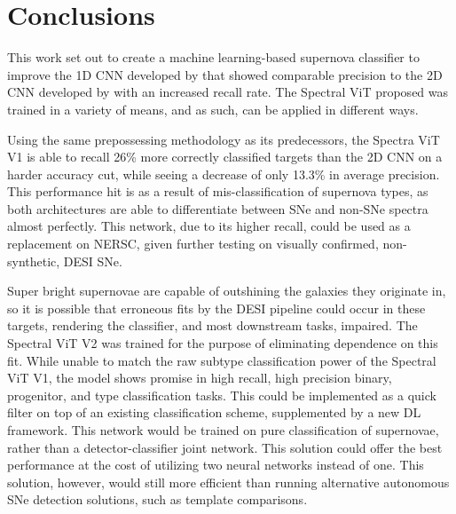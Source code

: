 \chapter{Conclusions}
\label{chap:conclusions}





This work set out to create a machine learning-based supernova classifier to improve 
the 1D CNN developed by \textcite{wasserman2021} that showed comparable 
precision to the 2D CNN developed by \textcite{Sepeku2022} with an increased recall rate. 
The Spectral ViT proposed was trained in a variety of means, and as such, can be applied in different ways.  


Using the same prepossessing methodology as its predecessors, the Spectra ViT V1 is able to recall 
26\% more correctly classified targets than the 2D CNN on a harder accuracy cut, while seeing a decrease 
of only 13.3\% in average precision. This performance hit is as a result of mis-classification of supernova types, 
as both architectures are able to differentiate between SNe and non-SNe spectra almost perfectly. This 
network, due to its higher recall, could be used as a replacement on NERSC, given further testing 
on visually confirmed, non-synthetic, DESI SNe. 

Super bright supernovae are capable of outshining the galaxies they originate in, so it is possible that 
erroneous fits by the DESI pipeline could occur in these targets, rendering the classifier, and most downstream tasks, 
impaired. The Spectral ViT V2 was trained for the purpose of eliminating dependence on this fit.
While unable to match the raw subtype classification power of the Spectral ViT V1, the 
model shows promise in high recall, high precision binary, progenitor, and type classification tasks. 
This could be implemented as a quick filter on top of an existing classification scheme,
supplemented by a new DL framework. This network would be trained on pure classification of 
supernovae, rather than a detector-classifier joint network. This solution could offer the best performance at the cost 
of utilizing two neural networks instead of one. This solution, however, would still more efficient than running alternative 
autonomous SNe detection solutions, such as template comparisons. 


